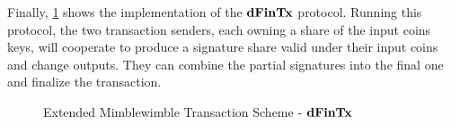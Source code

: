 Finally, \cref{fig:ext-mim-tx-fin} shows the implementation of the $\mathbf{dFinTx}$ protocol.
Running this protocol, the two transaction senders, each owning a share of the input coins keys, will cooperate to produce a signature share valid under their input coins and change outputs.
They can combine the partial signatures into the final one and finalize the transaction.

\begin{figure}
    \begin{center}
    \end{center}
    \caption{Extended Mimblewimble Transaction Scheme - $\mathbf{dFinTx}$ \label{fig:ext-mim-tx-fin}}
\end{figure}

